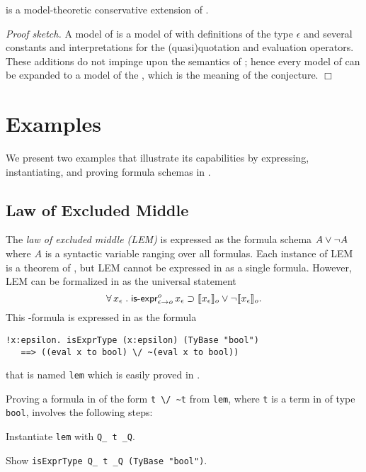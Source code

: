 \documentclass[fleqn]{llncs}
\begin{document}
\begin{conjecture}\bsp
{\HLQE} is a model-theoretic conservative extension of {\HL}.\esp
\end{conjecture}

\noindent
\emph{Proof sketch.}  A model of {\HLQE} is a model of {\HL} with
definitions of the type $\epsilon$ and several constants and
interpretations for the (quasi)quotation and evaluation operators.
These additions do not impinge upon the semantics of {\HL}; hence
every model of {\HL} can be expanded to a model of the {\HLQE}, which
is the meaning of the conjecture.  \hfill $\Box$

\section{Examples}\label{sec:examples}

We present two examples that illustrate its capabilities by expressing,
instantiating, and proving formula schemas in {\HLQE}.

\subsection{Law of Excluded Middle}

The \emph{law of excluded middle (LEM)} is expressed as the formula
schema $A \vee \neg A$ where $A$ is a syntactic variable ranging over
all formulas.  Each instance of LEM is a theorem of {\HOL}, but LEM
cannot be expressed in {\HOL} as a single formula.  However, LEM can
be formalized in {\churchqe} as the universal statement
\[\forall\, x_\epsilon \mathrel. 
\mbox{\sf is-expr}_{\epsilon \rightarrow o}^{o} \, x_\epsilon \supset
\llbracket x_\epsilon\rrbracket_o \vee \neg \llbracket x_\epsilon\rrbracket_o.\] This
{\churchqe}-formula is expressed in {\HLQE} as the formula
\begin{lstlisting}
!x:epsilon. isExprType (x:epsilon) (TyBase "bool")
   ==> ((eval x to bool) \/ ~(eval x to bool))
\end{lstlisting}
that is named \texttt{lem} which is easily proved in {\HLQE}.  

Proving a formula in {\HLQE} of the form \verb+t \/ ~t+ from
\texttt{lem}, where \texttt{t} is a term in {\HLQE} of type
\texttt{bool}, involves the following steps:

\be

  \item Instantiate \texttt{lem} with \texttt{Q\_ t \_Q}.

  \item Show \texttt{isExprType Q\_ t \_Q (TyBase "bool")}.
\end{document}
